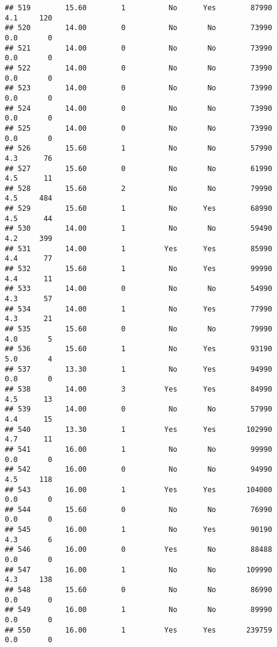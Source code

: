 \documentclass[
]{article}
\begin{document}
\begin{verbatim}
## 519        15.60        1          No      Yes        87990         4.1     120
## 520        14.00        0          No       No        73990         0.0       0
## 521        14.00        0          No       No        73990         0.0       0
## 522        14.00        0          No       No        73990         0.0       0
## 523        14.00        0          No       No        73990         0.0       0
## 524        14.00        0          No       No        73990         0.0       0
## 525        14.00        0          No       No        73990         0.0       0
## 526        15.60        1          No       No        57990         4.3      76
## 527        15.60        0          No       No        61990         4.5      11
## 528        15.60        2          No       No        79990         4.5     484
## 529        15.60        1          No      Yes        68990         4.5      44
## 530        14.00        1          No       No        59490         4.2     399
## 531        14.00        1         Yes      Yes        85990         4.4      77
## 532        15.60        1          No      Yes        99990         4.4      11
## 533        14.00        0          No       No        54990         4.3      57
## 534        14.00        1          No      Yes        77990         4.3      21
## 535        15.60        0          No       No        79990         4.0       5
## 536        15.60        1          No      Yes        93190         5.0       4
## 537        13.30        1          No      Yes        94990         0.0       0
## 538        14.00        3         Yes      Yes        84990         4.5      13
## 539        14.00        0          No       No        57990         4.4      15
## 540        13.30        1         Yes      Yes       102990         4.7      11
## 541        16.00        1          No       No        99990         0.0       0
## 542        16.00        0          No       No        94990         4.5     118
## 543        16.00        1         Yes      Yes       104000         0.0       0
## 544        15.60        0          No       No        76990         0.0       0
## 545        16.00        1          No      Yes        90190         4.3       6
## 546        16.00        0         Yes       No        88488         0.0       0
## 547        16.00        1          No       No       109990         4.3     138
## 548        15.60        0          No       No        86990         0.0       0
## 549        16.00        1          No       No        89990         0.0       0
## 550        16.00        1         Yes      Yes       239759         0.0       0

\end{verbatim}
\end{document}
